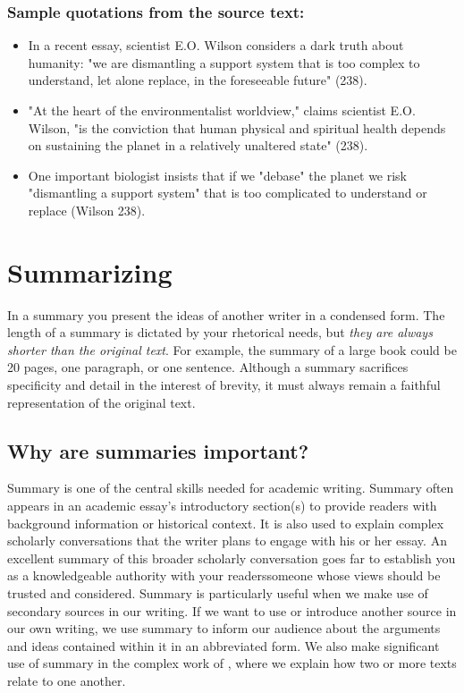 \subsubsection*{Sample quotations from the source text:}

\begin{itemize}

\item In a recent essay, scientist E.O. Wilson considers a dark truth about humanity: "we are dismantling a support system that is too complex to understand, let alone replace, in the foreseeable future" (238).

\item "At the heart of the environmentalist worldview," claims scientist E.O. Wilson, "is the conviction that human physical and spiritual health depends on sustaining the planet in a relatively unaltered state" (238).

\item One important biologist insists that if we "debase" the planet we risk "dismantling a support system" that is too complicated to understand or replace (Wilson 238).

\end{itemize}

\hypertarget{summary}{}
\section{Summarizing}
In a summary you present the ideas of another writer in a condensed form. The
length of a summary is dictated by your rhetorical needs, but \emph{they are
always shorter than the original text}. For example, the summary of a large
book could be 20 pages, one paragraph, or one sentence. Although a summary
sacrifices specificity and detail in the interest of brevity, it must always
remain a faithful representation of the original text.


\subsection {Why are summaries important?}

Summary is one of the central skills needed for academic writing. Summary often appears in an academic essay's introductory section(s) to provide readers with background information or historical context. It is also used to explain complex scholarly conversations that the writer plans to engage with his or her essay. An excellent summary of this broader scholarly conversation goes far to establish you as a knowledgeable authority with your readers\textemdash someone whose views should be trusted and considered. Summary is particularly useful when we make use of secondary sources in our writing. If we want to use or introduce another source in our own writing, we use summary to inform our audience about the arguments and ideas contained within it in an abbreviated form. We also make significant use of summary in the complex work of \hyperlink{synthesis}{\color{Ahrenge}{synthesis}}, where we explain how two or more texts relate to one another. 


